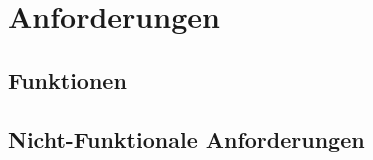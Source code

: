 %
%


\chapter{Anforderungen}
\label{Anforderungen}


\section{Funktionen}

%
%
%



%
%
%
%
%
%


\section{Nicht-Funktionale Anforderungen}

%
%
%



%
%
%
%
%
%



